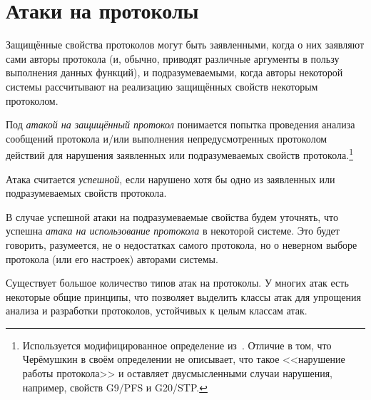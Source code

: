 \section{Атаки на протоколы}\label{section-protocols-attacks}

Защищённые свойства протоколов могут быть заявленными, когда о них заявляют сами авторы протокола (и, обычно, приводят различные аргументы в пользу выполнения данных функций), и подразумеваемыми, когда авторы некоторой системы рассчитывают на реализацию защищённых свойств некоторым протоколом.

Под \emph{атакой на защищённый протокол} понимается попытка проведения анализа сообщений протокола и/или выполнения непредусмотренных протоколом действий для нарушения заявленных или подразумеваемых свойств протокола.\footnote{Используется модифицированное определение из~\cite{Cheremushkin:2009}. Отличие в том, что Черёмушкин в своём определении не описывает, что такое <<нарушение работы протокола>> и оставляет двусмысленными случаи нарушения, например, свойств G9/PFS и G20/STP.}

Атака считается \emph{успешной}, если нарушено хотя бы одно из заявленных или подразумеваемых свойств протокола.

В случае успешной атаки на подразумеваемые свойства будем уточнять, что успешна \emph{атака на использование протокола} в некоторой системе. Это будет говорить, разумеется, не о недостатках самого протокола, но о неверном выборе протокола (или его настроек) авторами системы.

Существует большое количество типов атак на протоколы. У многих атак есть некоторые общие принципы, что позволяет выделить классы атак для упрощения анализа и разработки протоколов, устойчивых к целым классам атак.

